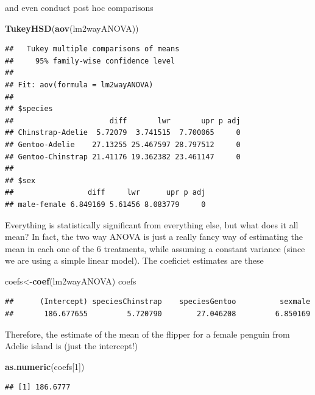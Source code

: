 \documentclass[
]{book}
\newenvironment{Shaded}{\begin{snugshade}}{\end{snugshade}}
\newcommand{\DecValTok}[1]{\textcolor[rgb]{0.00,0.00,0.81}{#1}}
\newcommand{\FunctionTok}[1]{\textcolor[rgb]{0.13,0.29,0.53}{\textbf{#1}}}
\newcommand{\NormalTok}[1]{#1}
\newcommand{\OtherTok}[1]{\textcolor[rgb]{0.56,0.35,0.01}{#1}}
\begin{document}
and even conduct post hoc comparisons

\begin{Shaded}
\begin{Highlighting}[]
\FunctionTok{TukeyHSD}\NormalTok{(}\FunctionTok{aov}\NormalTok{(lm2wayANOVA))}
\end{Highlighting}
\end{Shaded}

\begin{verbatim}
##   Tukey multiple comparisons of means
##     95% family-wise confidence level
## 
## Fit: aov(formula = lm2wayANOVA)
## 
## $species
##                      diff       lwr       upr p adj
## Chinstrap-Adelie  5.72079  3.741515  7.700065     0
## Gentoo-Adelie    27.13255 25.467597 28.797512     0
## Gentoo-Chinstrap 21.41176 19.362382 23.461147     0
## 
## $sex
##                 diff     lwr      upr p adj
## male-female 6.849169 5.61456 8.083779     0
\end{verbatim}

Everything is statistically significant from everything else, but what does it all mean? In fact, the two way ANOVA is just a really fancy way of estimating the mean in each one of the 6 treatments, while assuming a constant variance (since we are using a simple linear model). The coeficiet estimates are these

\begin{Shaded}
\begin{Highlighting}[]
\NormalTok{coefs}\OtherTok{\textless{}{-}}\FunctionTok{coef}\NormalTok{(lm2wayANOVA)}
\NormalTok{coefs}
\end{Highlighting}
\end{Shaded}

\begin{verbatim}
##      (Intercept) speciesChinstrap    speciesGentoo          sexmale 
##       186.677655         5.720790        27.046208         6.850169
\end{verbatim}

Therefore, the estimate of the mean of the flipper for a female penguin from Adelie island is (just the intercept!)

\begin{Shaded}
\begin{Highlighting}[]
\FunctionTok{as.numeric}\NormalTok{(coefs[}\DecValTok{1}\NormalTok{])}
\end{Highlighting}
\end{Shaded}

\begin{verbatim}
## [1] 186.6777
\end{verbatim}
\end{document}
